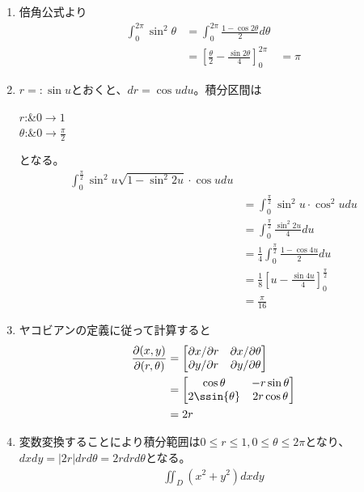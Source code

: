 \begin{souanswer} %
\begin{enumerate}
    \item 倍角公式より
\begin{align*}
    \int_0^{2\pi} \sin^2{\theta}
    &= \int_0^{2\pi} \frac{1- \cos{2\theta}}{2}d\theta\\
    &= \left[\frac{\theta}{2}- \frac{\sin{2\theta}}{4}\right]_0^{2\pi}
    &= \pi
\end{align*}

    \item $r= :\sin{u}$とおくと、$dr= \cos{u}du$。積分区間は\begin{tabular}[cl]$r$:&$0\to 1$\\ $\theta$:&$0\to \frac{\pi}{2}$\end{tabular}となる。
\begin{align*}
    \int_0^{\frac{\pi}{2}} \sin^2{u}\sqrt{1- \sin^2{2u}}\cdot \cos{u}du\\
    &= \int_0^{\frac{\pi}{2}} \sin^2{u}\cdot \cos^2{u}du\\
    &= \int_0^{\frac{\pi}{2}} \frac{\sin^2{2u}}{4}du\\
    &= \frac{1}{4}\int_0^{\frac{\pi}{2}}\frac{1- \cos{4u}}{2}du\\
    &= \frac{1}{8}\left[u- \frac{\sin{4u}}{4}\right]_0^{\frac{\pi}{2}}\\
    &= \frac{\pi}{16}
\end{align*}
    \item ヤコビアンの定義に従って計算すると
\begin{align*}
    \frac{\partial (x, y)}{\partial (r, \theta)}
    &= \begin{bmatrix}\partial x/\partial r& \partial x/\partial \theta\\ \partial y/\partial r& \partial y/\partial \theta\end{bmatrix}\\
    &= \begin{bmatrix}\cos{\theta}& -r\sin{\theta}\\ 2\ssin{\theta}& 2r\cos{\theta}\end{bmatrix}\\
    &= 2r
\end{align*}
    \item 変数変換することにより積分範囲は$0\le r\le 1, 0\le \theta\le 2\pi$となり、$dxdy= |2r|drd\theta= 2rdrd\theta$となる。
\begin{align*}
    \iint_D (x^2+ y^2)dxdy\\

\end{align*}
\end{enumerate}
\end{souanswer}
